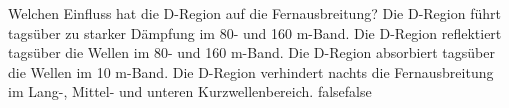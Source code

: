     {Welchen Einfluss hat die D-Region auf die Fernausbreitung?}
    {Die D-Region führt tagsüber zu starker Dämpfung im 80- und 160 m-Band.}
    {Die D-Region reflektiert tagsüber die Wellen im 80- und 160 m-Band.}
    {Die D-Region absorbiert tagsüber die Wellen im 10 m-Band.}
    {Die D-Region verhindert nachts die Fernausbreitung im Lang-, Mittel- und unteren Kurzwellenbereich.}
    {false}{false}